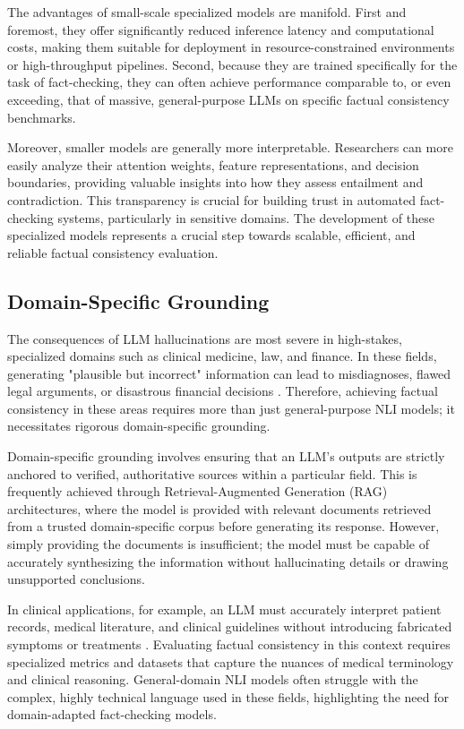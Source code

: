 \documentclass[11pt,a4paper]{article}
\begin{document}
The advantages of small-scale specialized models are manifold. First and foremost, they offer significantly reduced inference latency and computational costs, making them suitable for deployment in resource-constrained environments or high-throughput pipelines. Second, because they are trained specifically for the task of fact-checking, they can often achieve performance comparable to, or even exceeding, that of massive, general-purpose LLMs on specific factual consistency benchmarks.

Moreover, smaller models are generally more interpretable. Researchers can more easily analyze their attention weights, feature representations, and decision boundaries, providing valuable insights into how they assess entailment and contradiction. This transparency is crucial for building trust in automated fact-checking systems, particularly in sensitive domains. The development of these specialized models represents a crucial step towards scalable, efficient, and reliable factual consistency evaluation.

\subsection{Domain-Specific Grounding}

The consequences of LLM hallucinations are most severe in high-stakes, specialized domains such as clinical medicine, law, and finance. In these fields, generating "plausible but incorrect" information can lead to misdiagnoses, flawed legal arguments, or disastrous financial decisions \cite{Aghaebrahimian_2025_Aligncheck}. Therefore, achieving factual consistency in these areas requires more than just general-purpose NLI models; it necessitates rigorous domain-specific grounding.

Domain-specific grounding involves ensuring that an LLM's outputs are strictly anchored to verified, authoritative sources within a particular field. This is frequently achieved through Retrieval-Augmented Generation (RAG) architectures, where the model is provided with relevant documents retrieved from a trusted domain-specific corpus before generating its response. However, simply providing the documents is insufficient; the model must be capable of accurately synthesizing the information without hallucinating details or drawing unsupported conclusions.

In clinical applications, for example, an LLM must accurately interpret patient records, medical literature, and clinical guidelines without introducing fabricated symptoms or treatments \cite{Aghaebrahimian_2025_Aligncheck}. Evaluating factual consistency in this context requires specialized metrics and datasets that capture the nuances of medical terminology and clinical reasoning. General-domain NLI models often struggle with the complex, highly technical language used in these fields, highlighting the need for domain-adapted fact-checking models.
\end{document}

